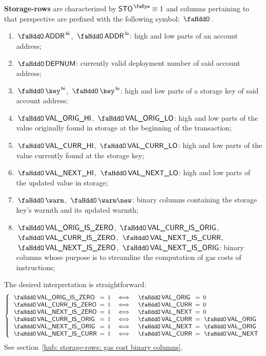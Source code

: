 \textbf{Storage-rows} are characterized by $\peekStorage \equiv 1$ and columns pertaining to that perspective are prefixed with the following symbol: $\storageSignifier$.
\begin{enumerate}
	\item
		$\stoAddressHi$,
		$\stoAddressLo$:
		high and low parts of an account address;
	\item
		$\stoDeploymentNumber$:
		currently valid deployment number of said account address;
	\item
		$\stoKeyHi$,
		$\stoKeyLo$:
		high and low parts of a storage key of said account address;
	\item
		$\stoOrigValueHi$,
		$\stoOrigValueLo$:
		high and low parts of the value originally found in storage at the beginning of the transaction;
	\item
		$\stoCurrValueHi$,
		$\stoCurrValueLo$:
		high and low parts of the value currently found at the storage key;
	\item
		$\stoNextValueHi$,
		$\stoNextValueLo$:
		high and low parts of the updated value in storage;
	\item
		$\stoWarmth$,
		$\stoWarmth\new$:
		binary columns containing the storage key's warmth and its updated warmth; 
	\item
		$\stoOrigValueIsZero$,
		$\stoCurrValueIsOrig$,
		$\stoCurrValueIsZero$,
		$\stoNextValueIsCurr$,
		$\stoNextValueIsZero$,
		$\stoNextValueIsOrig$:
		binary columns whose purpose is to streamline the computation of gas costs of  instructions;
\end{enumerate}
The desired interpretation is straightforward:
\[
	\left\{ \begin{array}{lclclcl}
		\stoOrigValueIsZero & \!\!\! = \!\!\! & 1 & \iff & \stoOrigValue & \!\!\! = \!\!\! & 0           \\
		\stoCurrValueIsZero & \!\!\! = \!\!\! & 1 & \iff & \stoCurrValue & \!\!\! = \!\!\! & 0           \\
		\stoNextValueIsZero & \!\!\! = \!\!\! & 1 & \iff & \stoNextValue & \!\!\! = \!\!\! & 0           \\
		\stoCurrValueIsOrig & \!\!\! = \!\!\! & 1 & \iff & \stoCurrValue & \!\!\! = \!\!\! & \stoOrigValue \\
		\stoNextValueIsOrig & \!\!\! = \!\!\! & 1 & \iff & \stoNextValue & \!\!\! = \!\!\! & \stoOrigValue \\
		\stoNextValueIsCurr & \!\!\! = \!\!\! & 1 & \iff & \stoCurrValue & \!\!\! = \!\!\! & \stoNextValue \\
	\end{array} \right.
\]
See section~\ref{hub: storage-rows: gas cost binary columns}.
